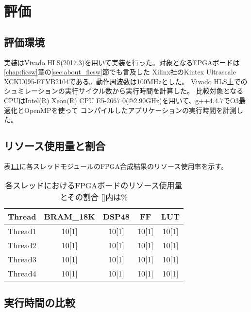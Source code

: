 \chapter{評価}
{
\label{chap:eval}

\section{評価環境}
\label{sec:eval_env}
実装はVivado HLS(2017.3)を用いて実装を行った。対象となるFPGAボードは\ref{chap:ficsw}章の\ref{sec:about_ficsw}節でも言及した
Xilinx社のKintex Ultrascale　XCKU095-FFVB2104である。動作周波数は100MHzとした。
Vivado HLS上でのシュミレーションの実行サイクル数から実行時間を計算した。
比較対象となるCPUはIntel(R) Xeon(R) CPU E5-2667 0(@2.90GHz)を用いて、g++4.4.7でO3最適化とOpenMPを使って
コンパイルしたアプリケーションの実行時間を計測した。

\section{リソース使用量と割合}
\label{sec:resource_util}
表\ref{table:resource_util}に各スレッドモジュールのFPGA合成結果のリソース使用率を示す。

\begin{table}[p]
    \begin{center}
    \caption{各スレッドにおけるFPGAボードのリソース使用量とその割合 []内は\%}
    \label{table:resource_util}
    \begin{tabular}{|c|c|c|c|c|} \hline
    \multicolumn{1}{|c|}{Thread} & \multicolumn{1}{|c|}{BRAM\_18K} & \multicolumn{1}{|c|}{DSP48} & \multicolumn{1}{|c|}{FF} & \multicolumn{1}{|c|}{LUT} \\ \hline \hline
    Thread1       & 10[1] & 10[1] & 10[1] & 10[1] \\ \hline
    Thread2       & 10[1] & 10[1] & 10[1] & 10[1] \\ \hline
    Thread3       & 10[1] & 10[1] & 10[1] & 10[1] \\ \hline
    Thread4       & 10[1] & 10[1] & 10[1] & 10[1] \\ \hline
    \end{tabular}
    \end{center}
\end{table}


\section{実行時間の比較}
\label{sec:resource_util}

}
